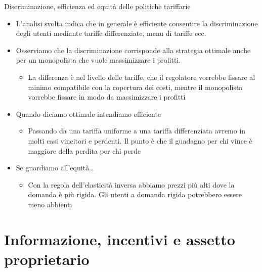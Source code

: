 \documentclass[aspectratio=149,11pt]{beamer}
\begin{document}
\begin{frame}{Discriminazione, efficienza ed equità delle politiche tariffarie}
\begin{itemize}
\item L'analisi svolta indica che in generale è efficiente consentire la
discriminazione degli utenti mediante tariffe differenziate, menu di tariffe
ecc.
\item Osserviamo che la discriminazione corrisponde alla strategia ottimale anche
per un monopolista che vuole massimizzare i profitti.
\begin{itemize}
\item La differenza è nel \alert{livello} delle tariffe, che il regolatore vorrebbe
fissare al minimo compatibile con la copertura dei costi, mentre il
monopolista vorrebbe fissare in modo da massimizzare i profitti
\end{itemize}
\item Quando diciamo \alert{ottimale} intendiamo \alert{efficiente}
\begin{itemize}
\item Passando da una tariffa uniforme a una tariffa differenziata avremo in
molti casi vincitori e perdenti. Il punto è che il guadagno per chi vince
è maggiore della perdita per chi perde
\end{itemize}
\item Se guardiamo all'equità\ldots{}
\begin{itemize}
\item Con la regola dell'elasticità inversa abbiamo prezzi più alti dove la domanda è più rigida. Gli utenti a domanda rigida potrebbero essere meno abbienti
\end{itemize}
\end{itemize}
\end{frame}

\section{Informazione, incentivi e assetto proprietario}
\end{document}

